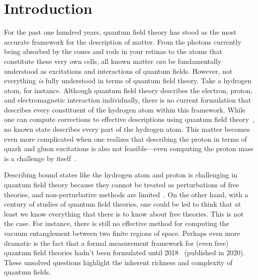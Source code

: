 \documentclass[letterpaper,12pt,titlepage,oneside,final]{book}
\begin{document}


 

%

\chapter*{Introduction}\label{chap:Intro}


For the past one hundred years, quantum field theory has stood as the most accurate framework for the description of matter. From the photons currently being absorbed by the cones and rods in your retinas to the atoms that constitute these very own cells, all known matter \textit{can} be fundamentally understood as excitations and interactions of quantum fields. However, not everything \textit{is} fully understood in terms of quantum field theory. Take a hydrogen atom, for instance. Although quantum field theory describes the electron, proton, and electromagnetic interaction individually, there is no current formulation that describes every constituent of the hydrogen atom within this framework. While one can compute corrections to effective descriptions using quantum field theory~\cite{gfactorBeier2000,gfactorIndelicato2004,gfactorTwoLoop2013,gfactor2020,gfactorExp2023}, no known state describes every part of the hydrogen atom. This matter becomes even more complicated when one realizes that describing the proton in terms of quark and gluon excitations is also not feasible---even computing the proton mass is a challenge by itself~\cite{QCD}.


Describing bound states like the hydrogen atom and proton is challenging in quantum field theory because they cannot be treated as perturbations of free theories, and non-perturbative methods are limited~\cite{nonpertComment2004,nonpertComment2021}. On the other hand, with a century of studies of quantum field theories, one could be led to think that at least we know everything that there is to know about free theories. This is not the case. For instance, there is still no effective method for computing the vacuum entanglement between two finite regions of space. Perhaps even more dramatic is the fact that a formal measurement framework for (even free) quantum field theories hadn't been formulated until 2018~\cite{FVOG} (published in 2020). These unsolved questions highlight the inherent richness and complexity of quantum fields.
\end{document}
